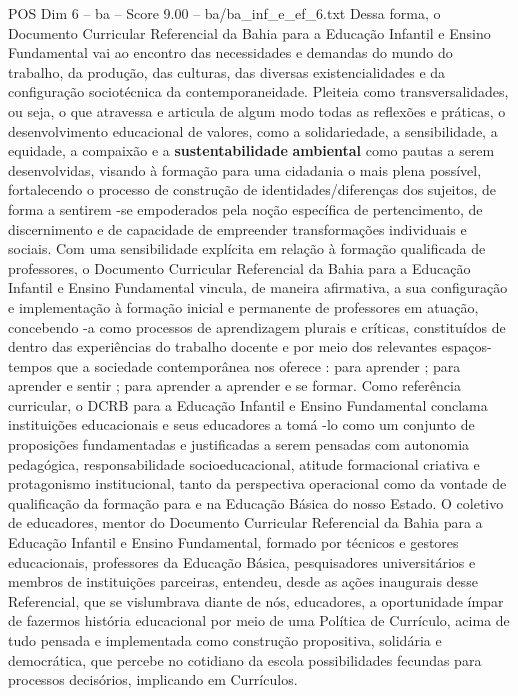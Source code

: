 \begin{textsample}{POS Dim 6 – ba – Score 9.00 – ba/ba\_inf\_e\_ef\_6.txt}
Dessa forma, o Documento Curricular Referencial da Bahia para a Educação Infantil e Ensino Fundamental vai ao encontro das necessidades e demandas do mundo do trabalho, da produção, das culturas, das diversas existencialidades e da configuração sociotécnica da contemporaneidade.
Pleiteia como transversalidades, ou seja, o que atravessa e articula de algum modo todas as reflexões e práticas, o desenvolvimento educacional de valores, como a solidariedade, a sensibilidade, a equidade, a compaixão e a \textbf{sustentabilidade} \textbf{ambiental} como pautas a serem desenvolvidas, visando à formação para uma cidadania o mais plena possível, fortalecendo o processo de construção de identidades/diferenças dos sujeitos, de forma a sentirem -se empoderados pela noção específica de pertencimento, de discernimento e de capacidade de empreender transformações individuais e sociais.
Com uma sensibilidade explícita em relação à formação qualificada de professores, o Documento Curricular Referencial da Bahia para a Educação Infantil e Ensino Fundamental vincula, de maneira afirmativa, a sua configuração e implementação à formação inicial e permanente de professores em atuação, concebendo -a como processos de aprendizagem plurais e críticas, constituídos de dentro das experiências do trabalho docente e por meio dos relevantes espaços-tempos que a sociedade contemporânea nos oferece : para aprender ; para aprender e sentir ; para aprender a aprender e se formar.
Como referência curricular, o DCRB para a Educação Infantil e Ensino Fundamental conclama instituições educacionais e seus educadores a tomá -lo como um conjunto de proposições fundamentadas e justificadas a serem pensadas com autonomia pedagógica, responsabilidade socioeducacional, atitude formacional criativa e protagonismo institucional, tanto da perspectiva operacional como da vontade de qualificação da formação para e na Educação Básica do nosso Estado.
O coletivo de educadores, mentor do Documento Curricular Referencial da Bahia para a Educação Infantil e Ensino Fundamental, formado por técnicos e gestores educacionais, professores da Educação Básica, pesquisadores universitários e membros de instituições parceiras, entendeu, desde as ações inaugurais desse Referencial, que se vislumbrava diante de nós, educadores, a oportunidade ímpar de fazermos história educacional por meio de uma Política de Currículo, acima de tudo pensada e implementada como construção propositiva, solidária e democrática, que percebe no cotidiano da escola possibilidades fecundas para processos decisórios, implicando em Currículos.

\end{textsample}
